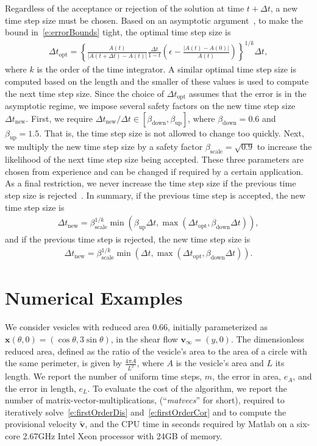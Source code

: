 \documentclass[3p,times,procedia]{elsarticle}
\newcommand{\vv}{{\mathbf{v}}}
\newcommand{\xx}{{\mathbf{x}}}
\newcommand{\down}{{\mathrm{down}}}
\newcommand{\new}{{\mathrm{new}}}
\newcommand{\opt}{{\mathrm{opt}}}
\newcommand{\tvv}{{\tilde{\vv}}}
\newcommand{\up}{{\mathrm{up}}}
\newcommand{\scale}{{\mathrm{scale}}}
\begin{document}
Regardless of the acceptance or rejection of the solution at time $t +
\Delta t$, a new time step size must be chosen.  Based on an asymptotic
argument~\cite{qua:bir2014c}, to make the bound
in~\eqref{e:errorBounds} tight, the optimal time step size is
\begin{align*}
  \Delta t_{\opt} = \left\{
    \frac{A(t)}{|A(t+\Delta t) - A(t)|} \frac{\Delta t}{1-t} \left(
    \epsilon - \frac{|A(t)-A(0)|}{A(t)} \right)
    \right\}^{1/k} \Delta t,
\end{align*}
where $k$ is the order of the time integrator.  A similar optimal time
step size is computed based on the length and the smaller of these
values is used to compute the next time step size.  Since the choice of
$\Delta t_{\opt}$ assumes that the error is in the asymptotic regime,
we impose several safety factors on the new time step size $\Delta
t_{\new}$.  First, we require $\Delta t_{\new} / \Delta t \in
[\beta_{\down},\beta_{\up}]$, where $\beta_{\down} = 0.6$ and
$\beta_{\up} = 1.5$.  That is, the time step size is not allowed to
change too quickly.  Next, we multiply the new time step size by a
safety factor $\beta_{\scale} = \sqrt{0.9}$ to increase the likelihood
of the next time step size being accepted.  These three parameters are
chosen from experience and can be changed if required by a certain
application.  As a final restriction, we never increase the time step
size if the previous time step size is
rejected~\cite{hai:nor:wan1993}.  In summary, if the previous time step
is accepted, the new time step size is
\begin{align*}
  \Delta t_{\new} = \beta_{\scale}^{1/k}\min(\beta_{\up}\Delta t,
    \max(\Delta t_{\opt},\beta_{\down}\Delta t)),
\end{align*}
and if the previous time step is rejected, the new time step size is
\begin{align*}
  \Delta t_{\new} = \beta_{\scale}^{1/k}\min(\Delta t,
    \max(\Delta t_{\opt},\beta_{\down}\Delta t)).
\end{align*}


\section{Numerical Examples}
\label{s:NumericalExamples}
We consider vesicles with reduced area 0.66, initially parameterized as
$\xx(\theta,0) = (\cos \theta,3\sin \theta)$, in the shear flow
$\vv_{\infty} = (y,0)$.  The dimensionless reduced area, defined as the
ratio of the vesicle's area to the area of a circle with the same
perimeter, is given by $\frac{4\pi A}{L^{2}}$, where $A$ is the
vesicle's area and $L$ its length.  We report the number of uniform time
steps, $m$, the error in area, $e_{A}$, and the error in length,
$e_{L}$.  To evaluate the cost of the algorithm, we report the number of
matrix-vector-multiplications, (``{\em matvecs}'' for short), required
to iteratively solve~\eqref{e:firstOrderDis} and~\eqref{e:firstOrderCor}
and to compute the provisional velocity $\tvv$, and the CPU time in
seconds required by Matlab on a six-core 2.67GHz Intel Xeon processor
with 24GB of memory.
\end{document}
